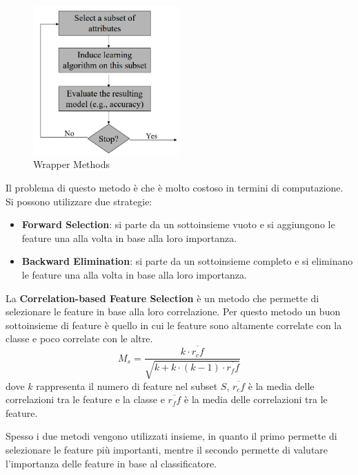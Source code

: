 \begin{itemize}
            \begin{figure}[!ht]
                  \centering
                  \includegraphics[width=0.5\textwidth]{./img/Preprocessing/wrapper.png}
                  \caption{Wrapper Methods}
                  \label{fig:wrapper}
            \end{figure}
            Il problema di questo metodo è che è molto costoso in termini di
            computazione. Si possono utilizzare due strategie:
            \begin{itemize}
                  \item \textbf{Forward Selection}: si parte da un sottoinsieme
                        vuoto e si aggiungono le feature una alla volta in base
                        alla loro importanza.
                  \item \textbf{Backward Elimination}: si parte da un sottoinsieme
                        completo e si eliminano le feature una alla volta in base
                        alla loro importanza.
            \end{itemize}
\end{itemize}

La \textbf{Correlation-based Feature Selection} è un metodo che permette di
selezionare le feature in base alla loro correlazione. Per questo metodo un 
buon sottoinsieme di feature è quello in cui le feature sono altamente correlate
con la classe e poco correlate con le altre. 
\begin{equation}
      M_s = \frac{k \cdot \overline{r_cf}}{\sqrt{k + k \cdot (k - 1) \cdot \overline{r_ff}}}
\end{equation}
dove $k$ rappresenta il numero di feature nel subset $S$, $\overline{r_cf}$ è la
media delle correlazioni tra le feature e la classe e $\overline{r_ff}$ è la media
delle correlazioni tra le feature.

Spesso i due metodi vengono utilizzati insieme, in quanto il primo permette di
selezionare le feature più importanti, mentre il secondo permette di valutare
l'importanza delle feature in base al classificatore.